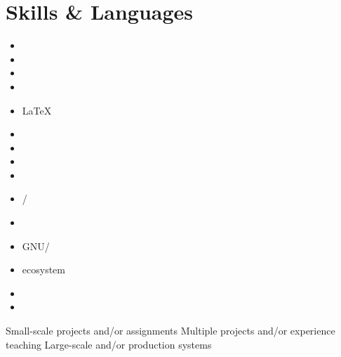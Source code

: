 \documentclass[10pt]{article}
\begin{document}
\newcommand{\skills}[2]{
  \item #2 #1
}

\vspace{-2em}

\section{Skills \& Languages}

\vspace{-1em}

\setlength{\columnsep}{-2cm}
\begin{multicols}{5}
\raggedcolumns
\begin{small}
\begin{itemize}
\renewcommand{\labelitemi}{}
\renewcommand{\skill}{\textnormal}
\setlength{\itemsep}{1pt}
\setlength{\parskip}{0pt}
\setlength{\parsep}{0pt}

\skills{\bash}{\threeskill}
\skills{\clojure}{\threeskill}
\skills{\java}{\threeskill}
\skills{\js}{\twoskill}
\skills{\LaTeX}{\twoskill}
\skills{\python}{\threeskill}
\skills{\matlab}{\twoskill}

\skills{\django}{\twoskill}
\skills{\git}{\threeskill}
\skills{\numpy/\scipy}{\threeskill}
\skills{\opencv}{\threeskill}

\skills{GNU/\linux}{\threeskill}
\skills{\hadoop ecosystem}{\threeskill}
\skills{\postgres}{\threeskill}
\skills{\spark}{\threeskill}


\end{itemize}
\end{small}
\end{multicols}
\setlength{\columnsep}{0pt}

\vspace{-1.5em}

\begin{footnotesize}
  \oneskill Small-scale projects and/or assignments \hfill
  \twoskill Multiple projects and/or experience teaching \hfill
  \threeskill Large-scale and/or production systems
\end{footnotesize}
\end{document}
